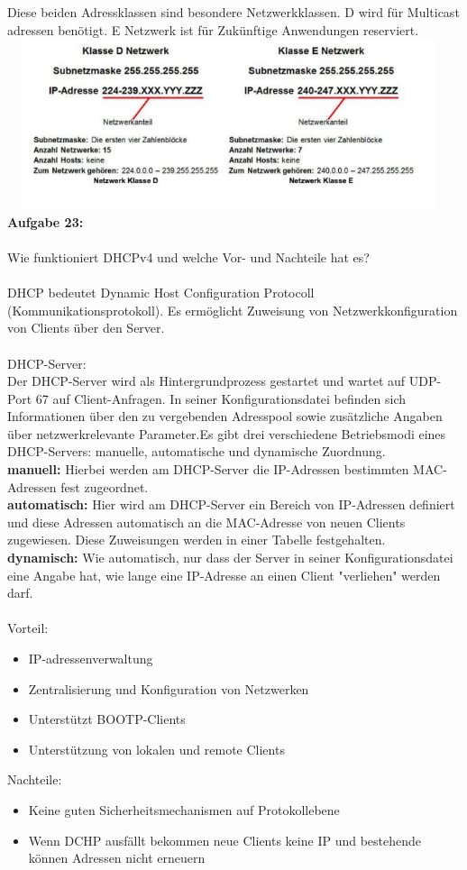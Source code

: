 \documentclass[12pt,a4paper]{report}
\begin{document}
Diese beiden Adressklassen sind besondere Netzwerkklassen.
D wird für Multicast adressen benötigt. E Netzwerk ist für Zukünftige Anwendungen
reserviert.\\
\includegraphics[width = 13cm, height = 5cm]{classde.jpg}
\newpage
\ \\
\textbf{Aufgabe 23:}
\\
\\
Wie funktioniert DHCPv4 und welche Vor- und Nachteile hat es?
\\
\\
DHCP bedeutet Dynamic Host Configuration Protocoll (Kommunikationsprotokoll). Es
ermöglicht Zuweisung von Netzwerkkonfiguration von Clients über den Server.\\
\\
DHCP-Server:\\
Der DHCP-Server wird als Hintergrundprozess gestartet und wartet auf UDP-Port 67 auf Client-Anfragen. In seiner Konfigurationsdatei befinden sich Informationen über den zu vergebenden Adresspool sowie zusätzliche Angaben über netzwerkrelevante Parameter.Es gibt drei verschiedene Betriebsmodi eines DHCP-Servers: manuelle, automatische und dynamische Zuordnung.\\
\textbf{manuell:} Hierbei werden am DHCP-Server die IP-Adressen bestimmten MAC-Adressen fest zugeordnet.\\
\textbf{automatisch:} Hier wird am DHCP-Server ein Bereich von IP-Adressen definiert und diese Adressen automatisch an die MAC-Adresse von neuen Clients zugewiesen. Diese Zuweisungen werden in einer Tabelle festgehalten.\\
\textbf{dynamisch:} Wie automatisch, nur dass der Server in seiner Konfigurationsdatei eine Angabe hat, wie lange eine IP-Adresse an einen Client "verliehen" werden darf.\\
\\
Vorteil:
\begin{itemize}
	\item IP-adressenverwaltung
	\item Zentralisierung und Konfiguration von Netzwerken
	\item Unterstützt BOOTP-Clients
	\item Unterstützung von lokalen und remote Clients
\end{itemize}
Nachteile:
\begin{itemize}
\item Keine guten Sicherheitsmechanismen auf Protokollebene
\item Wenn DCHP ausfällt bekommen neue Clients keine IP und bestehende können
Adressen nicht erneuern
\end{itemize}
\end{document}
